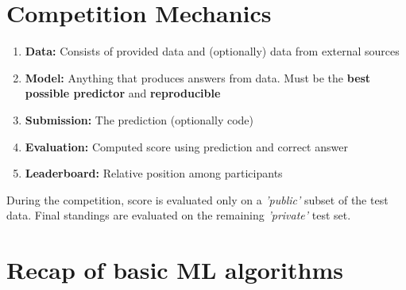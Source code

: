 \documentclass[a4paper]{article}
\begin{document}

\section{Competition Mechanics}

\begin{enumerate}
\item \textbf{Data:} Consists of provided data and (optionally) data from external sources
\item \textbf{Model:} Anything that produces answers from data. Must be the \textbf{best possible predictor} and \textbf{reproducible}
\item \textbf{Submission:} The prediction (optionally code)
\item \textbf{Evaluation:} Computed score using prediction and correct answer
\item \textbf{Leaderboard:} Relative position among participants
\end{enumerate}

During the competition, score is evaluated only on a \textit{'public'} subset of the test data. Final standings are evaluated on the remaining \textit{'private'} test set.

\section{Recap of basic ML algorithms}
\end{document}

